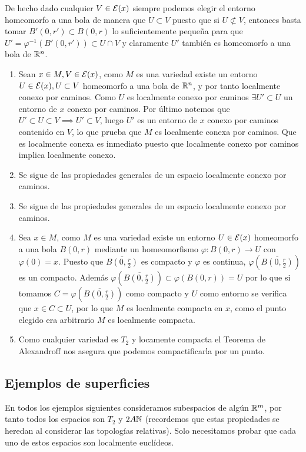 {  De hecho dado cualquier $V\in\mathcal{E}(x)$ siempre podemos elegir el entorno homeomorfo a una bola de manera que $U\subset V$ puesto que si $U\not\subset V$, entonces basta tomar $B'(0,r')\subset B(0,r)$ lo suficientemente pequeña para que $U'=\varphi^{-1}(B'(0,r'))\subset U\cap V$ y claramente $U'$ también es homeomorfo a una bola de $\mathbb{R}^n$.
    \begin{enumerate}
      \item Sean $x\in M, V\in\mathcal{E}(x)$, como $M$ es una variedad existe un entorno $U\in\mathcal{E}(x),U\subset V$ homeomorfo a una bola de $\mathbb{R}^n$, y por tanto localmente conexo por caminos. Como $U$ es localmente conexo por caminos $\exists U'\subset U$ un entorno de $x$ conexo por caminos. Por último notemos que $U'\subset U\subset V\implies U'\subset V$, luego $U'$ es un entorno de $x$ conexo por caminos contenido en $V$, lo que prueba que $M$ es localmente conexa por caminos. Que es localmente conexa es inmediato puesto que localmente conexo por caminos implica localmente conexo. 
      \item Se sigue de las propiedades generales de un espacio localmente conexo por caminos.
      \item Se sigue de las propiedades generales de un espacio localmente conexo por caminos.
      \item Sea $x\in M$, como $M$ es una variedad existe un entorno $U\in\mathcal{E}(x)$ homeomorfo a una bola $B(0,r)$ mediante un homeomorfismo $\varphi : B(0,r)\rightarrow U $ con $\varphi(0) = x$. Puesto que $\overline{B(0,\frac{r}{2})}$ es compacto y $\varphi$ es continua, $\varphi(\overline{B(0,\frac{r}{2})})$ es un compacto. Además $\varphi(\overline{B(0,\frac{r}{2})})\subset\varphi(B(0,r))=U$ por lo que si tomamos $C=\varphi(\overline{B(0,\frac{r}{2})})$ como compacto y $U$ como entorno se verifica que $x\in C\subset U$, por lo que $M$ es localmente compacta en $x$, como el punto elegido era arbitrario $M$ es localmente compacta.
      \item Como cualquier variedad es $T_2$ y locamente compacta el Teorema de Alexandroff nos asegura que podemos compactificarla por un punto.
    \end{enumerate}
}

\clearpage

\subsection{Ejemplos de superficies}

En todos los ejemplos siguientes consideramos subespacios de algún $\mathbb{R}^m$, por tanto todos los espacios son $T_2$ y $2A\mathbb{N}$ (recordemos que estas propiedades se heredan al considerar las topologías relativas). Solo necesitamos probar que cada uno de estos espacios son localmente euclídeos.

